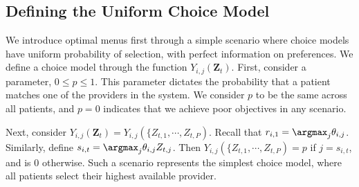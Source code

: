 \subsection{Defining the Uniform Choice Model}
We introduce optimal menus first through a simple scenario where choice models have uniform probability of selection, with perfect information on preferences. 
We define a choice model through the function $Y_{i,j}(\mathbf{Z}_{t})$. 
First, consider a parameter, $0 \leq p \leq 1$. 
This parameter dictates the probability that a patient matches one of the providers in the system. 
We consider $p$ to be the same across all patients, and $p=0$ indicates that we achieve poor objectives in any scenario. 

Next, consider $Y_{i,j}(\mathbf{Z}_{t}) = Y_{i,j}(\{Z_{t,1}, \cdots, Z_{t,P})$. 
Recall that $r_{i,1} = \argmax_{j} \theta_{i,j}$. 
Similarly, define $s_{i,t} = \argmax_{j} \theta_{i,j} Z_{t,j}$. 
Then $Y_{i,j}(\{Z_{t,1}, \cdots, Z_{t,P}) = p$ if $j = s_{i,t}$, and is $0$ otherwise. 
Such a scenario represents the simplest choice model, where all patients select their highest available provider. 


